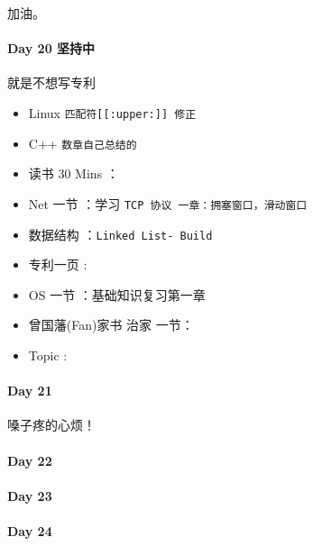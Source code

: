 \documentclass[UTF8,a4paper,8pt]{ctexart}
\begin{document}
	 	 加油。
 	 \paragraph{Day 20  坚持中    \quad     }
	 	 就是不想写专利
	 	 
	 	 \begin{itemize}[itemindent = 1em]
	 	 	\renewcommand\labelitemi{\makebox[0pt][l]{$\square$}\hspace{1em}} 
	 	 	\renewcommand\labelitemi{\makebox[0pt][l]{$\square$}\raisebox{.15ex}{\hspace{0.1em}$\checkmark$}}	 	
	 	 	\item   Linux \verb|匹配符[[:upper:]] 修正|
	 	 	\item   C++   \verb|数章自己总结的|
	 	 	
	 	 	\item   读书  30 Mins	：\verb||
	 	 	\item   Net 一节 ：学习 \verb|TCP 协议 一章：拥塞窗口，滑动窗口|	
	 	 	
	 	 	\renewcommand\labelitemi{\makebox[0pt][l]{$\square$}\hspace{1em}} 
	 	 	\item   数据结构 ：\verb|Linked List- Build| 
	 	 	\item   专利一页 :	
	 	 	\item   OS  一节 ：基础知识复习第一章
	 	 	
	 	 	\renewcommand\labelitemi{\makebox[0pt][l]{$\square$}\raisebox{.15ex}{\hspace{0.1em}$\checkmark$}}
	 	 	\item   曾国藩(Fan)家书 治家 一节：
	 	 	\item   Topic :
	 	 \end{itemize}
	 	 
 	 \paragraph{Day 21      \quad     }
	 	 嗓子疼的心烦！
	 	 
 	 \paragraph{Day 22      \quad     }
 	 \paragraph{Day 23      \quad     }
 	 \paragraph{Day 24      \quad     }
	 	 
\end{document}
